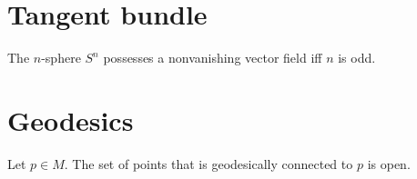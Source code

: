 \documentclass{../exp}
\begin{document}
\section{Tangent bundle}


\begin{prop}
The $n$-sphere $S^n$ possesses a nonvanishing vector field iff $n$ is odd.
\end{prop}


\section{Geodesics}

\begin{prop}
Let $p\in M$.
The set of points that is geodesically connected to $p$ is open.
\end{prop}
\end{document}
